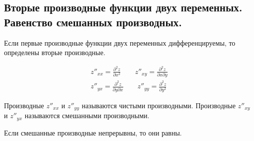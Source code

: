 \subsection{%
  Вторые производные функции двух переменных. Равенство смешанных производных.%
}

\begin{definition}
  Если первые производные функции двух переменных дифференцируемы, то определены
  вторые производные.

  \begin{equation*}
    \begin{aligned}
      z''_{xx} = \frac{\partial^2 z}{\partial x^2}
      \qquad
      z''_{xy} = \frac{\partial^2 z}{\partial x \partial y}
    \\
      z''_{yx} = \frac{\partial^2 z}{\partial y \partial x}
      \qquad
      z''_{yy} = \frac{\partial^2 z}{\partial y^2 }
    \end{aligned}  
  \end{equation*}

  Производные \(z''_{xx}\) и \(z''_{yy}\) называются чистыми производными.
  Производные \(z''_{xy}\) и \(z''_{yx}\) называются смешанными производными.
\end{definition}

\begin{theorem}[Шварца]
  Если смешанные производные непрерывны, то они равны.
\end{theorem}

